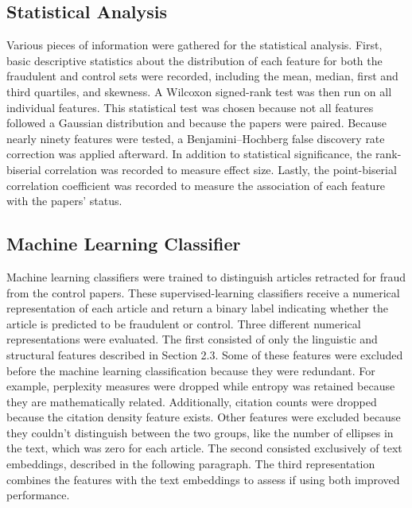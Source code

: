 \documentclass[11pt,letterpaper]{article}
\begin{document}
\subsection{Statistical Analysis}

Various pieces of information were gathered for the statistical analysis. First, basic descriptive statistics about the distribution of each feature for both the fraudulent and control sets were recorded, including the mean, median, first and third quartiles, and skewness. A Wilcoxon signed-rank test was then run on all individual features. This statistical test was chosen because not all features followed a Gaussian distribution and because the papers were paired. Because nearly ninety features were tested, a Benjamini--Hochberg false discovery rate correction was applied afterward. In addition to statistical significance, the rank-biserial correlation was recorded to measure effect size. Lastly, the point-biserial correlation coefficient was recorded to measure the association of each feature with the papers' status.

\subsection{Machine Learning Classifier}

Machine learning classifiers were trained to distinguish articles retracted for fraud from the control papers. These supervised-learning classifiers receive a numerical representation of each article and return a binary label indicating whether the article is predicted to be fraudulent or control. Three different numerical representations were evaluated. The first consisted of only the linguistic and structural features described in Section 2.3. Some of these features were excluded before the machine learning classification because they were redundant. For example, perplexity measures were dropped while entropy was retained because they are mathematically related. Additionally, citation counts were dropped because the citation density feature exists. Other features were excluded because they couldn't distinguish between the two groups, like the number of ellipses in the text, which was zero for each article. The second consisted exclusively of text embeddings, described in the following paragraph. The third representation combines the features with the text embeddings to assess if using both improved performance.
\end{document}
